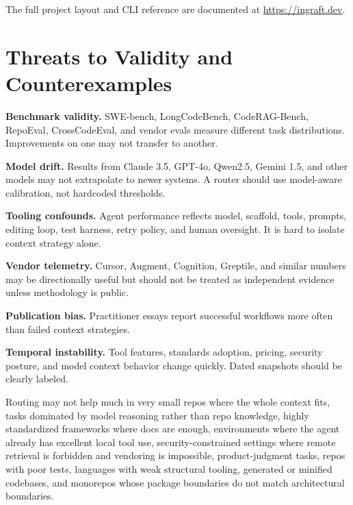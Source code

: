 \documentclass[
  11pt,
  letterpaper,
  numbers=noendperiod,
  parskip=half]{scrartcl}
\begin{document}
\noindent The full project layout and CLI reference are documented at
\url{https://ingraft.dev}.

\iffalse
\section{Threats to Validity and Counterexamples}\label{sec-threats}

\textbf{Benchmark validity.} SWE-bench, LongCodeBench, CodeRAG-Bench,
RepoEval, CrossCodeEval, and vendor evals measure different task
distributions. Improvements on one may not transfer to another.

\textbf{Model drift.} Results from Claude 3.5, GPT-4o, Qwen2.5, Gemini
1.5, and other models may not extrapolate to newer systems. A router
should use model-aware calibration, not hardcoded thresholds.

\textbf{Tooling confounds.} Agent performance reflects model, scaffold,
tools, prompts, editing loop, test harness, retry policy, and human
oversight. It is hard to isolate context strategy alone.

\textbf{Vendor telemetry.} Cursor, Augment, Cognition, Greptile, and
similar numbers may be directionally useful but should not be treated as
independent evidence unless methodology is public.

\textbf{Publication bias.} Practitioner essays report successful
workflows more often than failed context strategies.

\textbf{Temporal instability.} Tool features, standards adoption,
pricing, security posture, and model context behavior change quickly.
Dated snapshots should be clearly labeled.

Routing may not help much in very small repos where the whole context
fits, tasks dominated by model reasoning rather than repo knowledge,
highly standardized frameworks where docs are enough, environments where
the agent already has excellent local tool use, security-constrained
settings where remote retrieval is forbidden and vendoring is
impossible, product-judgment tasks, repos with poor tests, languages
with weak structural tooling, generated or minified codebases, and
monorepos whose package boundaries do not match architectural
boundaries.
\end{document}
